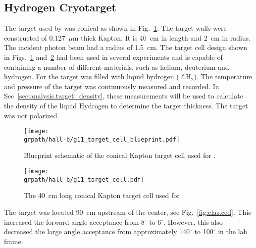 \subsection{Hydrogen Cryotarget}\label{sec:clas.tgt}


The target used by  was conical as shown in Fig.~\ref{fig:clas.targetblueprint}. The target walls were constructed of 0.127~$\mu$m thick Kapton. It is 40~cm in length and 2~cm in radius. The incident photon beam had a radius of 1.5~cm. The target cell design shown in Figs,~\ref{fig:clas.targetblueprint} and~\ref{fig:clas.targetcell} had been used in several experiments and is capable of containing a number of different materials, such as helium, deuterium and hydrogen. For  the target was filled with liquid hydrogen ($\ell$H$_2$). The temperature and pressure of the target was continuously measured and recorded. In Sec~\ref{sec:analysis.target_density}, these measurements will be used to calculate the density of the liquid Hydrogen to determine the target thickness. The target was not polarized.

\begin{figure}[h!]\begin{center}
\texttt{[image: \\grpath/hall-b/g11\_target\_cell\_blueprint.pdf]}
\caption[Blueprint schematic of the conical Kapton target cell used for ]{\label{fig:clas.targetblueprint}Blueprint schematic of the conical Kapton target cell used for .}
\end{center}\end{figure}

\begin{figure}[h!]\begin{center}
\texttt{[image: \\grpath/hall-b/g11\_target\_cell.pdf]}
\caption[The 40~cm long conical Kapton target cell used for ]{\label{fig:clas.targetcell}The 40~cm long conical Kapton target cell used for .}
\end{center}\end{figure}

The target was located 90~cm upstream of  the center, see Fig.~\ref{fig:clas.ced}.
This increased the forward angle acceptance from 8$^\circ$  to 6$^\circ$. However, this also decreased the large angle acceptance from approximately 140$^\circ$ to 100$^\circ$ in the lab frame.
\FloatBarrier